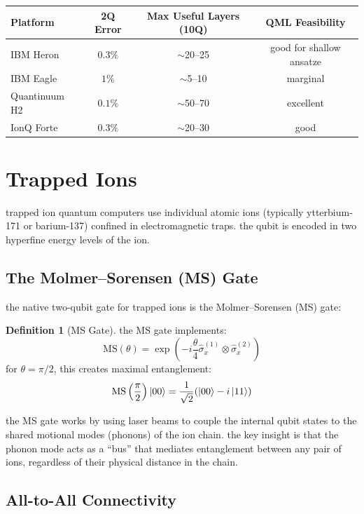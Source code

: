 \documentclass[11pt,a4paper]{article}
\theoremstyle{definition}
\newtheorem{definition}{Definition}[section]
\theoremstyle{remark}
\begin{document}
\begin{center}
\renewcommand{\arraystretch}{1.3}
\begin{tabular}{|l|c|c|c|}
\hline
\textbf{Platform} & \textbf{2Q Error} & \textbf{Max Useful Layers (10Q)} & \textbf{QML Feasibility} \\
\hline
IBM Heron & $0.3\%$ & $\sim$20--25 & good for shallow ansatze \\
\hline
IBM Eagle & $1\%$ & $\sim$5--10 & marginal \\
\hline
Quantinuum H2 & $0.1\%$ & $\sim$50--70 & excellent \\
\hline
IonQ Forte & $0.3\%$ & $\sim$20--30 & good \\
\hline
\end{tabular}
\end{center}

\section{Trapped Ions}

trapped ion quantum computers use individual atomic ions (typically ytterbium-171 or barium-137) confined in electromagnetic traps. the qubit is encoded in two hyperfine energy levels of the ion.

\subsection{The Molmer--Sorensen (MS) Gate}

the native two-qubit gate for trapped ions is the Molmer--Sorensen (MS) gate:

\begin{definition}[MS Gate]
the MS gate implements:
\[
\text{MS}(\theta) = \exp\left(-i \frac{\theta}{4} \hat{\sigma}_x^{(1)} \otimes \hat{\sigma}_x^{(2)}\right)
\]
for $\theta = \pi/2$, this creates maximal entanglement:
\[
\text{MS}\left(\frac{\pi}{2}\right) \ket{00} = \frac{1}{\sqrt{2}}(\ket{00} - i\ket{11})
\]
\end{definition}

the MS gate works by using laser beams to couple the internal qubit states to the shared motional modes (phonons) of the ion chain. the key insight is that the phonon mode acts as a ``bus'' that mediates entanglement between any pair of ions, regardless of their physical distance in the chain.

\subsection{All-to-All Connectivity}
\end{document}
